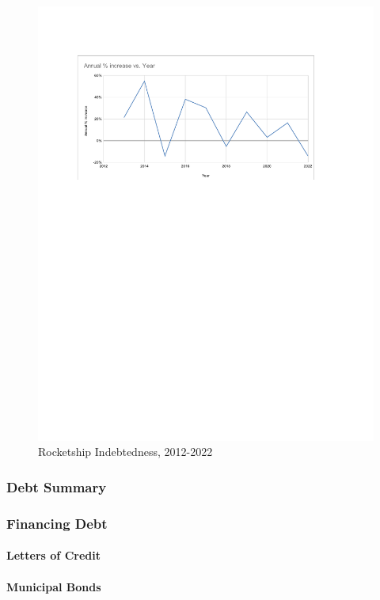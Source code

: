 \begin{figure}[b]
  \centering
  \includegraphics[width=\textwidth,keepaspectratio]{Annual_Debt_Increases}%
  \caption{Rocketship Indebtedness, 2012-2022}%
  \label{fig:annual_debt_increases}
\end{figure}

\subsubsection{Debt Summary}\indent%
\label{sec:debt_summary}

\subsubsection{Financing Debt}\indent%
\label{sec:financing_debt}

\paragraph{Letters of Credit}
\paragraph{Municipal Bonds}
